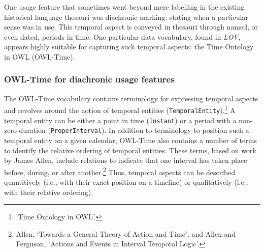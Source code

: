 One usage feature that sometimes went beyond mere labelling in the existing historical language thesauri was diachronic marking: stating when a particular sense was in use. This temporal aspect is conveyed in thesauri through named, or even dated, periods in time. One particular data vocabulary, found in \textit{LOV}, appears highly suitable for capturing such temporal aspects: the Time Ontology in OWL (OWL-Time).

\subsubsection{OWL-Time for diachronic usage features}
\label{sect:Stolk_thes-digital-form:owl-time}
The OWL-Time vocabulary contains terminology for expressing temporal aspects and revolves around the notion of temporal entities (\texttt{TemporalEntity}).\footnote{`Time Ontology in OWL'.} %
A temporal entity can be either a point in time (\texttt{Instant}) or a period with a non-zero duration (\texttt{ProperInterval}). In addition to terminology to position such a temporal entity on a given calendar, OWL-Time also contains a number of terms to identify the relative ordering of temporal entities. These terms, based on work by James Allen, include relations to indicate that one interval has taken place before, during, or after another.\footnote{Allen, `Towards a General Theory of Action and Time'; and Allen and Ferguson, `Actions and Events in Interval Temporal Logic'.} %
Thus, temporal aspects can be described quantitively (i.e., with their exact position on a timeline) or qualitatively (i.e., with their relative ordering).

